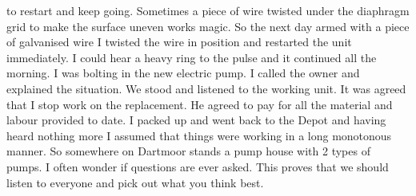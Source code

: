 to restart and keep going. Sometimes a piece of wire twisted under the
diaphragm grid to make the surface uneven works magic. So the next day armed
with a piece of galvanised wire I twisted the wire in position and restarted
the unit immediately. I could hear a heavy ring to the pulse and it continued
all the morning. I was bolting in the new electric pump. I called the owner and
explained the situation. We stood and listened to the working unit. It was
agreed that I stop work on the replacement. He agreed to pay for all the
material and labour provided to date. I packed up and went back to the Depot
and having heard nothing more I assumed that things were working in a long
monotonous manner. So somewhere on Dartmoor stands a pump house with 2 types of
pumps. I often wonder if questions are ever asked. This proves that we should
listen to everyone and pick out what you think best. 
